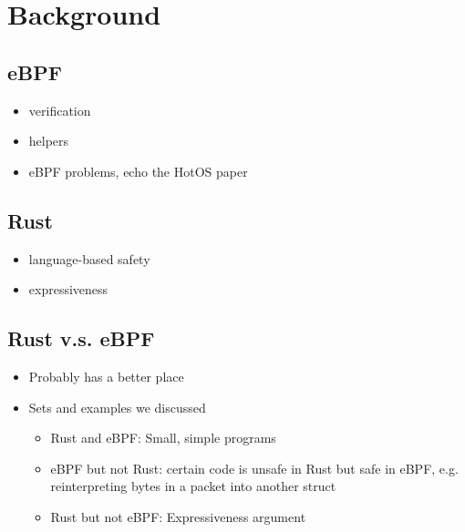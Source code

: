 \section{Background}

\subsection{eBPF}

\begin{itemize}
    \item verification
    \item helpers
    \item eBPF problems, echo the HotOS paper
\end{itemize}

\subsection{Rust}

\begin{itemize}
    \item language-based safety
    \item expressiveness
\end{itemize}

\subsection{Rust v.s. eBPF}

\begin{itemize}
    \item Probably has a better place
    \item Sets and examples we discussed
        \begin{itemize}
            \item Rust and eBPF: Small, simple programs
            \item eBPF but not Rust: certain code is unsafe in Rust but safe in
                eBPF, e.g. reinterpreting bytes in a packet into another struct
            \item Rust but not eBPF: Expressiveness argument
        \end{itemize}
\end{itemize}